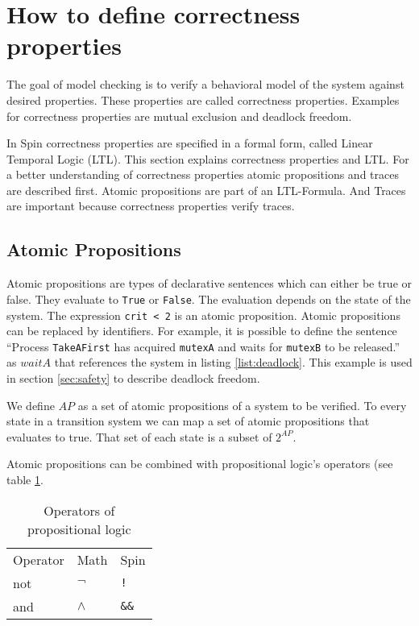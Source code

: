 \documentclass[12pt,a4paper,twoside]{article}
\begin{document}
\section{How to define correctness properties}
\label{sec:ltl}

The goal of model checking is to verify a behavioral model of the system against desired properties. These properties are called correctness properties. Examples for correctness properties are mutual exclusion and deadlock freedom. 

In Spin correctness properties are specified in a formal form, called Linear Temporal Logic (LTL). This section explains correctness properties and LTL. For a better understanding of correctness properties atomic propositions and traces are described first. Atomic propositions are part of an LTL-Formula. And Traces are important because correctness properties verify traces.

\subsection{Atomic Propositions}
\label{sec:atomicpropositions}

Atomic propositions are types of declarative sentences which can either be  true or false. They evaluate to \verb|True| or \verb|False|. The evaluation depends on the state of the system. The expression \verb|crit < 2| is an atomic proposition. Atomic propositions can be replaced by identifiers. For example, it is possible to define the sentence ``Process \verb|TakeAFirst| has acquired \verb|mutexA| and waits for \verb|mutexB| to be released.'' as $waitA$  that references the system in listing \ref{list:deadlock}. This example is used in section \ref{sec:safety} to describe deadlock freedom.
 
We define $AP$ as a set of atomic propositions of a system to be verified. To every state in a transition system we can map a set of atomic propositions that evaluates to true. That set of each state is a subset of $2^{AP}$.

Atomic propositions can be combined with propositional logic's operators (see table \ref{tab:operators_of_propositionallogic}.

\begin{table}[ht]
  \centering

  \begin{tabular}{l l l}
    Operator & Math & Spin \\
    not & $\neg$ & \verb|!| \\
    and & $\land$ & \verb|&&| \\
  \end{tabular}
  \caption{Operators of propositional logic }
  \label{tab:operators_of_propositionallogic}
\end{table}
\end{document}
